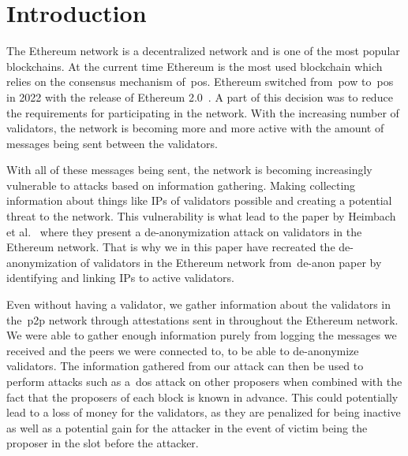 

\section{Introduction}\label{sec:introduction}
The Ethereum network is a decentralized network and is one of the most popular blockchains.
At the current time Ethereum is the most used blockchain which relies on the consensus mechanism of~\gls{pos}.
Ethereum switched from~\gls{pow} to~\gls{pos} in 2022 with the release of Ethereum 2.0~\cite{EthereumProof-of-stakePoS}.
A part of this decision was to reduce the requirements for participating in the network.
With the increasing number of validators, the network is becoming more and more active with the amount of messages being sent between the validators.


With all of these messages being sent, the network is becoming increasingly vulnerable to attacks based on information gathering.
Making collecting information about things like IPs of validators possible and creating a potential threat to the network.
This vulnerability is what lead to the paper by Heimbach et al.~\cite{heimbach2024deanonymizingethereumvalidatorsp2p} where they present a de-anonymization attack on validators in the Ethereum network.
That is why we in this paper have recreated the de-anonymization of validators in the Ethereum network from~\gls{de-anon paper} by identifying and linking IPs to active validators.


Even without having a validator, we gather information about the validators in the~\gls{p2p} network through attestations sent in throughout the Ethereum network.
We were able to gather enough information purely from logging the messages we received and the peers we were connected to, to be able to de-anonymize validators.
The information gathered from our attack can then be used to perform attacks such as a~\gls{dos} attack on other proposers when combined with the fact that the proposers of each block is known in advance.
This could potentially lead to a loss of money for the validators, as they are penalized for being inactive as well as a potential gain for the attacker in the event of victim being the proposer in the slot before the attacker.

